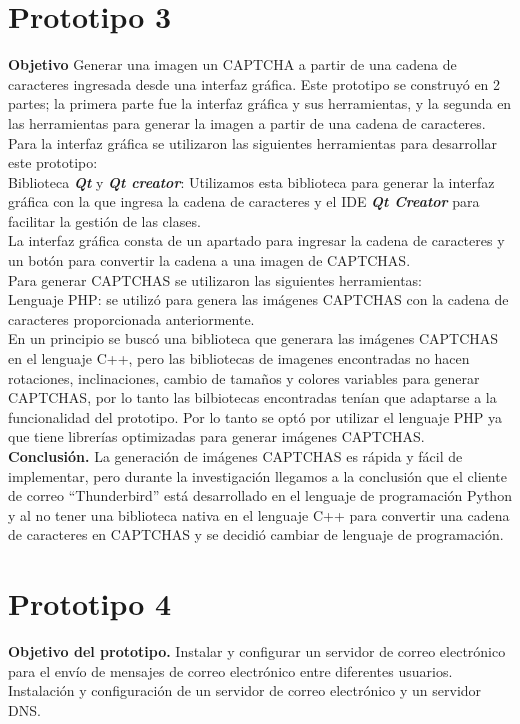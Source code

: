 \documentclass[12pt,oneside,onecolumn,openany]{report}
\begin{document}
\section{Prototipo 3}
\textbf{Objetivo}
Generar una imagen un CAPTCHA a partir de una cadena de caracteres ingresada desde una interfaz gráfica.
Este prototipo se construyó en 2 partes; la primera parte fue la interfaz gráfica y sus herramientas, y la segunda en las herramientas para generar la imagen a partir de una cadena de caracteres.\\
Para la interfaz gráfica se utilizaron las siguientes herramientas para desarrollar este prototipo:\\
Biblioteca \textbf{\textit{Qt}} y \textbf{\textit{Qt creator}}: Utilizamos esta biblioteca para generar la interfaz gráfica con la que ingresa la cadena de caracteres y el IDE \textbf{\textit{Qt Creator}} para facilitar la gestión de las clases.\\
La interfaz gráfica consta de un apartado para ingresar la cadena de caracteres y un botón para convertir la cadena a una imagen de CAPTCHAS.\\
Para generar CAPTCHAS se utilizaron las siguientes herramientas:\\
Lenguaje PHP: se utilizó para genera las imágenes CAPTCHAS con la cadena de caracteres proporcionada anteriormente.\\
En un principio se buscó una biblioteca que generara las imágenes CAPTCHAS en el lenguaje C++, pero las bibliotecas de imagenes encontradas no hacen rotaciones, inclinaciones, cambio de tamaños y colores variables para generar CAPTCHAS, por lo tanto las bilbiotecas encontradas tenían que adaptarse a la funcionalidad del prototipo. Por lo tanto se optó por utilizar el lenguaje PHP ya que tiene librerías optimizadas para generar imágenes CAPTCHAS.\\
\textbf{Conclusión.}
La generación de imágenes CAPTCHAS es rápida y fácil de implementar, pero durante la investigación llegamos a la conclusión que el cliente de correo “Thunderbird” está desarrollado en el lenguaje de programación Python y al no tener una biblioteca nativa en el lenguaje C++ para convertir una cadena de caracteres en CAPTCHAS y  se decidió cambiar de lenguaje de programación.\\



\section{Prototipo 4}
\textbf{Objetivo del prototipo.}
Instalar y configurar un servidor de correo electrónico para el envío de mensajes de correo electrónico entre diferentes usuarios.\\
Instalación y configuración de un servidor de correo electrónico y un servidor DNS.\\
\end{document}
